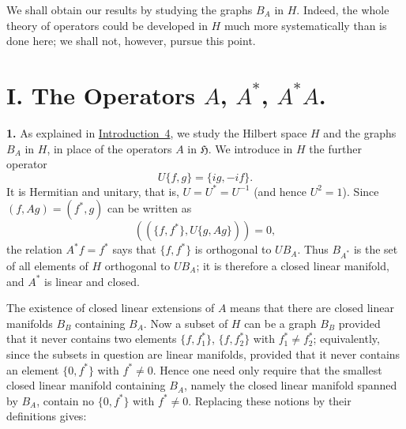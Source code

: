 \documentclass[fontsize=13pt,paper=b5,leqno,bookmarkpackage=false]{scrartcl}
\begin{document}

We shall obtain our results by studying the graphs \(B_A\) in \(H\).
Indeed, the whole theory of operators could be developed in \(H\) much more
systematically than is done here; we shall not, however, pursue this point.

\section*{I. The Operators \(A\), \(A^*\), \(A^*A\).}
\label{sec:operators-aaastara}

\label{subsec:I.1}
\noindent\textbf{1.}
As explained in \hyperref[intro:4]{Introduction~4}, we study the Hilbert
space \(H\) and the graphs \(B_A\) in \(H\), in place of the operators \(A\)
in \(\mathfrak H\).  We introduce in \(H\) the further operator
\[
  U\{f,g\}=\{ig,-if\}.
\]
It is Hermitian and unitary, that is,
\(U=U^*=U^{-1}\) (and hence \(U^2=1\)).  Since
\((f,Ag)=(f^*,g)\) can be written as
\[
  \left(\!\left(\{f,f^*\},U\{g,Ag\}\right)\!\right)=0,
\]
the relation \(A^*f=f^*\) says that \(\{f,f^*\}\) is orthogonal to
\(UB_A\).  Thus \(B_{A^*}\) is the set of all elements of \(H\) orthogonal
to \(UB_A\); it is therefore a closed linear manifold, and \(A^*\) is
linear and closed.

The existence of closed linear extensions of \(A\) means that there are
closed linear manifolds \(B_B\) containing \(B_A\).  Now a subset of \(H\)
can be a graph \(B_B\) provided that it never contains two elements
\(\{f,f_1^*\}\), \(\{f,f_2^*\}\) with \(f_1^*\ne f_2^*\); equivalently,
since the subsets in question are linear manifolds, provided that it never
contains an element \(\{0,f^*\}\) with \(f^*\ne0\).  Hence one need only
require that the smallest closed linear manifold containing \(B_A\), namely
the closed linear manifold spanned by \(B_A\), contain no \(\{0,f^*\}\)
with \(f^*\ne0\).  Replacing these notions by their definitions gives:
\end{document}
